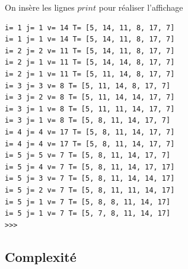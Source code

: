 \begin{exemple2}



On insère les lignes $print$ pour réaliser l'affichage


	\begin{DDbox}{\linewidth}
		\begin{verbatim}
i= 1 j= 1 v= 14 T= [5, 14, 11, 8, 17, 7]
i= 1 j= 1 v= 14 T= [5, 14, 11, 8, 17, 7]
i= 2 j= 2 v= 11 T= [5, 14, 11, 8, 17, 7]
i= 2 j= 1 v= 11 T= [5, 14, 14, 8, 17, 7]
i= 2 j= 1 v= 11 T= [5, 11, 14, 8, 17, 7]
i= 3 j= 3 v= 8 T= [5, 11, 14, 8, 17, 7]
i= 3 j= 2 v= 8 T= [5, 11, 14, 14, 17, 7]
i= 3 j= 1 v= 8 T= [5, 11, 11, 14, 17, 7]
i= 3 j= 1 v= 8 T= [5, 8, 11, 14, 17, 7]
i= 4 j= 4 v= 17 T= [5, 8, 11, 14, 17, 7]
i= 4 j= 4 v= 17 T= [5, 8, 11, 14, 17, 7]
i= 5 j= 5 v= 7 T= [5, 8, 11, 14, 17, 7]
i= 5 j= 4 v= 7 T= [5, 8, 11, 14, 17, 17]
i= 5 j= 3 v= 7 T= [5, 8, 11, 14, 14, 17]
i= 5 j= 2 v= 7 T= [5, 8, 11, 11, 14, 17]
i= 5 j= 1 v= 7 T= [5, 8, 8, 11, 14, 17]
i= 5 j= 1 v= 7 T= [5, 7, 8, 11, 14, 17]
>>> 
		\end{verbatim}
	\end{DDbox}



\end{exemple2}



\subsection{Complexité}

